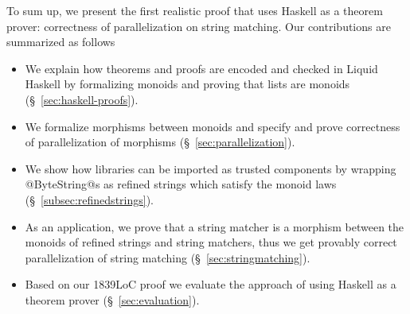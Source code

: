 To sum up, we present the first realistic proof that 
uses Haskell as a theorem prover:
correctness of parallelization on string matching.
%
Our contributions are summarized as follows
\begin{itemize}
\item We explain how theorems and proofs are encoded and checked in Liquid Haskell
by formalizing monoids and proving that lists are monoids
(\S~\ref{sec:haskell-proofs}).
\item We formalize morphisms between monoids and
specify and prove correctness of parallelization of morphisms
(\S~\ref{sec:parallelization}).
\item We show how libraries can be imported as trusted components by wrapping
@ByteString@s as refined strings which satisfy the monoid laws (\S~\ref{subsec:refinedstrings}).
\item As an application, we prove that a string matcher is a morphism between the monoids of refined strings
and string matchers,  thus we get provably correct parallelization of string matching (\S~\ref{sec:stringmatching}).
\item Based on our 1839LoC proof we evaluate the approach of using Haskell as a theorem prover
(\S~\ref{sec:evaluation}).
\end{itemize}
